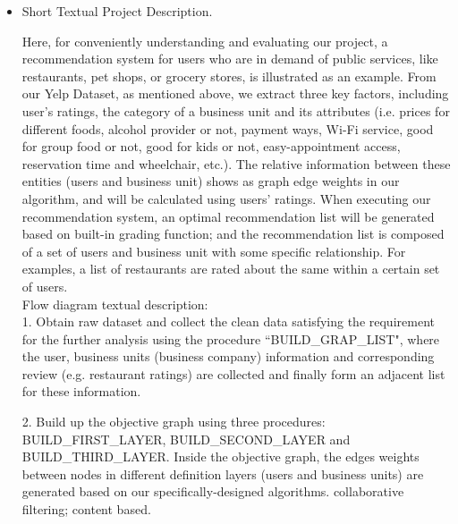 

\begin{itemize} 
\item{  Short Textual Project Description. }

Here, for conveniently understanding and evaluating our project, a recommendation system for users who are in demand of public services, like restaurants, pet shops, or grocery stores, is illustrated as an example. From our Yelp Dataset, as mentioned above, we extract three key factors, including user's ratings, the category of a business unit and its attributes (i.e. prices for different foods, alcohol provider or not, payment ways, Wi-Fi service, good for group food or not, good for kids or not, easy-appointment access, reservation time and wheelchair, etc.). The relative information between these entities (users and business unit) shows as graph edge weights in our algorithm, and will be calculated using users' ratings. When executing our recommendation system, an optimal recommendation list will be generated based on built-in grading function; and the recommendation list is composed of a set of users and business unit with some specific relationship. For examples, a list of restaurants are rated about the same within a certain set of users.\\


Flow diagram textual description:\\


1. Obtain raw dataset and collect the clean data satisfying the requirement for the further analysis using the procedure ``BUILD\_GRAP\_LIST", where the user, business units (business company) information and corresponding review (e.g. restaurant ratings) are collected and finally form an adjacent list for these information.

2. Build up the objective graph using three procedures: BUILD\_FIRST\_LAYER, BUILD\_SECOND\_LAYER and BUILD\_THIRD\_LAYER. Inside the objective graph, the edges weights between nodes in different definition layers (users and business units) are generated based on our specifically-designed algorithms. collaborative filtering; content based.


\end{itemize}
